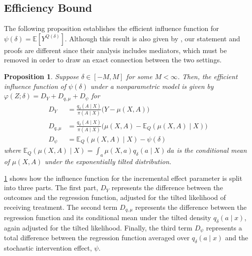 \documentclass[11pt,twoside]{article}
\newtheorem{proposition}{Proposition}
\theoremstyle{definition}
\theoremstyle{remark}
\begin{document}
\subsection{Efficiency Bound}

The following proposition establishes the efficient influence function for $\psi(\delta) = \mathbb{E}[Y^{Q(\delta)}]$. Although this result is also given by \cite{diaz2020causal}, our statement and proofs are different since their analysis includes mediators, which must be removed in order to draw an exact connection between the two settings.

\begin{proposition} \label{eif_theorem}
Suppose $\delta \in [-M,M]$ for some $M<\infty$. Then, the efficient influence function of $\psi(\delta)$ under a nonparametric model is given by $\varphi(Z;\delta) = D_Y + D_{q, \mu} + D_\psi$ for
\begin{align*}
    D_Y &= \frac{q_\delta(A \mid X)}{\pi(A \mid X)} \Big(Y - \mu(X, A) \Big) \\
    D_{q, \mu} &= \frac{q_\delta(A \mid X)}{\pi(A \mid X)}\Big( \mu(X, A) - \mathbb{E}_Q(\mu(X, A) \mid X) \Big) \\
    D_\psi &= \mathbb{E}_Q(\mu(X, A) \mid X)  - \psi(\delta)
\end{align*}
where $\mathbb{E}_Q(\mu(X, A) \mid X) = \int_a \mu(X, a) q_\delta(a \mid X) \, da$ is the conditional mean of $\mu(X, A)$ under the exponentially tilted distribution.
\end{proposition}

 \cref{eif_theorem} shows how the influence function for the incremental effect parameter is split into three parts. The first part, $D_Y$ represents the difference between the outcomes and the regression function, adjusted for the tilted likelihood of receiving treatment. The second term $D_{q, \mu}$ represents the difference between the regression function and its conditional mean under the tilted density $q_\delta(a \mid x)$, again adjusted for the tilted likelihood. Finally, the third term $D_\psi$ represents a total difference between the regression function averaged over $q_\delta(a \mid x)$ and the stochastic intervention effect, $\psi$.
\end{document}
